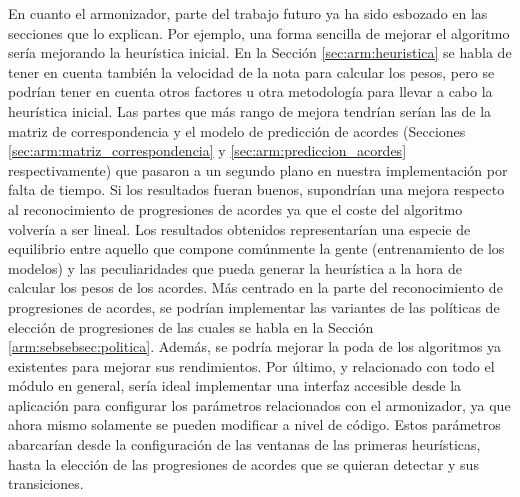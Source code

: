 En cuanto el armonizador, parte del trabajo futuro ya ha sido esbozado en las secciones que lo explican. Por ejemplo, una forma sencilla de mejorar el algoritmo sería mejorando la heurística inicial. En la Sección \ref{sec:arm:heuristica} se habla de tener en cuenta también la velocidad de la nota para calcular los pesos, pero se podrían tener en cuenta otros factores u otra metodología para llevar a cabo la heurística inicial. Las partes que más rango de mejora tendrían serían las de la matriz de correspondencia y el modelo de predicción de acordes (Secciones \ref{sec:arm:matriz_correspondencia} y \ref{sec:arm:prediccion_acordes} respectivamente) que pasaron a un segundo plano en nuestra implementación por falta de tiempo. Si los resultados fueran buenos, supondrían una mejora respecto al reconocimiento de progresiones de acordes ya que el coste del algoritmo volvería a ser lineal. Los resultados obtenidos representarían una especie de equilibrio entre aquello que compone comúnmente la gente (entrenamiento de los modelos) y las peculiaridades que pueda generar la heurística a la hora de calcular los pesos de los acordes. Más centrado en la parte del reconocimiento de progresiones de acordes, se podrían implementar las variantes de las políticas de elección de progresiones de las cuales se habla en la Sección \ref{arm:sebsebsec:politica}. Además, se podría mejorar la poda de los algoritmos ya existentes para mejorar sus rendimientos. Por último, y relacionado con todo el módulo en general, sería ideal implementar una interfaz accesible desde la aplicación para configurar los parámetros relacionados con el armonizador, ya que ahora mismo solamente se pueden modificar a nivel de código. Estos parámetros abarcarían desde la configuración de las ventanas de las primeras heurísticas, hasta la elección de las progresiones de acordes que se quieran detectar y sus transiciones.

